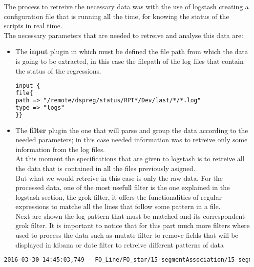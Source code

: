 The process to retreive the necessary data was with the use of logstash creating a configuration file that is running all the time, for knowing the status of the scripts in real time.\\

The necessary parameters that are needed to retreive and analyse this data are:\\ 
\begin{itemize}
\item The \textbf{input} plugin in which must be defined the file path from which the data is going to be extracted, in this case the filepath of the log files that contain the status of the regressions. 

\begin{lstlisting}[language=xml,frame=tb,caption={input plugin},label=lst:useless]
input {
file{
path => "/remote/dspreg/status/RPT*/Dev/last/*/*.log"
type => "logs"
}} 
\end{lstlisting}

\item The \textbf{filter} plugin the one that will parse and group the data according to the needed parameters; in this case needed information was to retreive only some information from the log files.\\

At this moment the specifications that are given to logstash is to retreive all the data that is contained in all the files previously asigned. 
\\

But what we would retreive in this case is only the raw data. For the processed data, one of the most usefull filter is the one explained in the logstash section, the grok filter, it offers the functionalities of regular expressions to matche all the lines that follow some pattern in a file.\\

Next are shown the log pattern that must be matched and its correspondent grok filter. It is important to notice that for this part much more filters where used to process the data such as mutate filter to remove fields that will be displayed in kibana or date filter to retreive different patterns of data
\end{itemize}
\begin{lstlisting}[language=xml,frame=tb,caption={logfile }]
2016-03-30 14:45:03,749 - FO_Line/FO_star/15-segmentAssociation/15-segmentAssociation.cry [root (data.py:auto_load_data:25)] [INFO] Loading data from D:\tts_shared\git\dev\regression_fo_line\data\common\common.py
\end{lstlisting}


